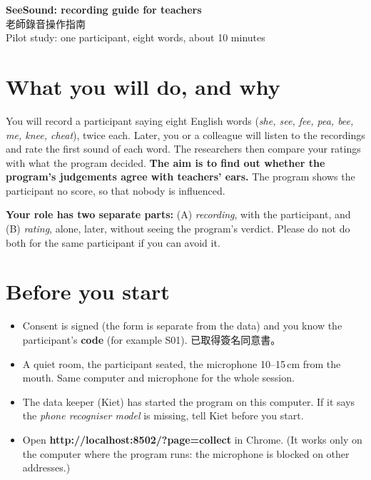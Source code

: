 \documentclass[11pt,a4paper]{article}
\begin{document}
\begin{center}{\LARGE\bfseries SeeSound: recording guide for teachers}\\[2pt]{\large 老師錄音操作指南}\\[2pt]Pilot study: one participant, eight words, about 10 minutes\end{center}

\section{What you will do, and why}
You will record a participant saying eight English words (\textit{she, see, fee, pea, bee, me, knee, cheat}), twice each. Later, you or a colleague will listen to the recordings and rate the first sound of each word. The researchers then compare your ratings with what the program decided. \textbf{The aim is to find out whether the program's judgements agree with teachers' ears.} The program shows the participant no score, so that nobody is influenced.

\textbf{Your role has two separate parts:} (A) \emph{recording}, with the participant, and (B) \emph{rating}, alone, later, without seeing the program's verdict. Please do not do both for the same participant if you can avoid it.

\section{Before you start}
\begin{itemize}
\item Consent is signed (the form is separate from the data) and you know the participant's \textbf{code} (for example S01). 已取得簽名同意書。
\item A quiet room, the participant seated, the microphone 10--15\,cm from the mouth. Same computer and microphone for the whole session.
\item The data keeper (Kiet) has started the program on this computer. If it says the \emph{phone recogniser model} is missing, tell Kiet before you start.
\item Open \textbf{http://localhost:8502/?page=collect} in Chrome. (It works only on the computer where the program runs: the microphone is blocked on other addresses.)
\end{itemize}
\end{document}
